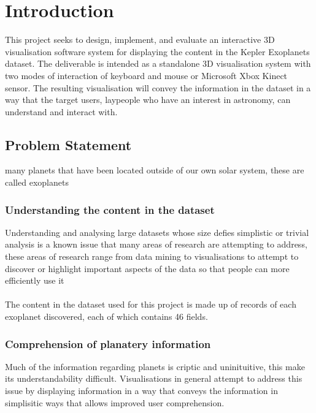 \chapter{Introduction}\label{C:intro}
This project seeks to design, implement, and evaluate an interactive 3D visualisation software system for displaying the content in the Kepler Exoplanets dataset. The deliverable is intended as a standalone 3D visualisation system with two modes of interaction of keyboard and mouse or Microsoft Xbox Kinect sensor. The resulting visualisation will convey the information in the dataset in a way that the target users, laypeople who have an interest in astronomy, can understand and interact with.

\section{Problem Statement}
many planets that have been located outside of our own solar system, these are
called exoplanets
\subsection{Understanding the content in the dataset}
Understanding and analysing large datasets whose size defies simplistic or trivial analysis is a known issue that many areas of research are attempting to address, these areas of research range from data mining to visualisations to attempt to discover or highlight important aspects of the data so that people can more efficiently use it
\\\\
The content in the dataset used for this project is made up of records of each exoplanet discovered, each of which contains 46 fields.

\subsection{Comprehension of planatery information}
Much of the information regarding planets is criptic and uninituitive, this make its understandability difficult. Visualisations in general attempt to address this issue by displaying information in a way that conveys the information in simplisitic ways that allows improved user comprehension.
\\\\

